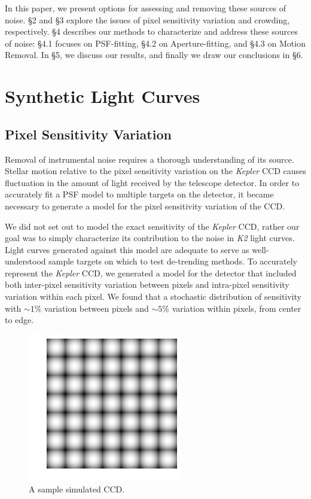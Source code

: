 \documentclass[12pt,preprint]{aastex}
\begin{document}
In this paper, we present options for assessing and removing these sources of noise. \S 2 and \S 3 explore the issues of pixel sensitivity variation and crowding, respectively. \S 4 describes our methods to characterize and address these sources of noise: \S 4.1 focuses on PSF-fitting, \S 4.2 on Aperture-fitting, and \S 4.3 on Motion Removal. In \S 5, we discuss our results, and finally we draw our conclusions in \S 6.

\section{Synthetic Light Curves}

\subsection{Pixel Sensitivity Variation}

Removal of instrumental noise requires a thorough understanding of its source. Stellar motion relative to the pixel sensitivity variation on the \textit{Kepler} CCD causes fluctuation in the amount of light received by the telescope detector. In order to accurately fit a PSF model to multiple targets on the detector, it became necessary to generate a model for the pixel sensitivity variation of the CCD.

We did not set out to model the exact sensitivity of the \textit{Kepler} CCD, rather our goal was to simply characterize its contribution to the noise in \textit{K2} light curves. Light curves generated against this model are adequate to serve as well-understood sample targets on which to test de-trending methods. To accurately represent the \textit{Kepler} CCD, we generated a model for the detector that included both inter-pixel sensitivity variation between pixels and intra-pixel sensitivity variation within each pixel. We found that a stochastic distribution of sensitivity with ${\sim}1\%$ variation between pixels and ${\sim}5\%$ variation within pixels, from center to edge.

\begin{figure}[h]
	\centering
	\includegraphics[width=.5\linewidth]{detector.png}
	\caption{A sample simulated CCD.}
	\label{fig:detector}
\end{figure}
\end{document}
